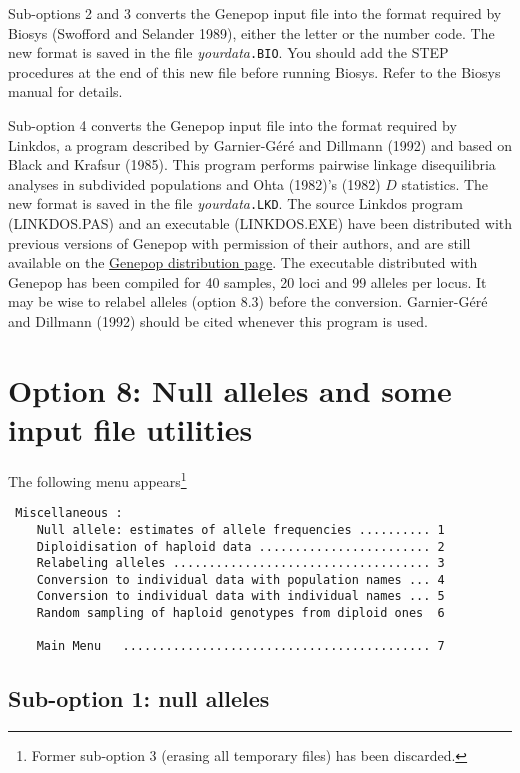 \documentclass[12pt,]{book}
\let\rmarkdownfootnote\footnote%
\def\footnote{\protect\rmarkdownfootnote}
\begin{document}
Sub-options 2 and 3 converts the Genepop input file into the format
required by Biosys (Swofford and Selander 1989),
either the letter or the number code. The new format is saved in the
file \emph{yourdata}\texttt{.BIO}. You should add the STEP procedures at
the end of this new file before running Biosys. Refer to the Biosys
manual for details.

Sub-option 4 converts the Genepop input file into the format required by
Linkdos, a program described by Garnier-Géré and
Dillmann (1992) and based on Black and Krafsur (1985). This program
performs pairwise linkage disequilibria analyses in subdivided
populations and Ohta (1982)'s (1982) \(D\)
statistics. The new
format is saved in the file \emph{yourdata}\texttt{.LKD}. The source
Linkdos program (LINKDOS.PAS) and an executable (LINKDOS.EXE) have been
distributed with previous versions of Genepop with permission of their
authors, and are still available on the
\href{http://kimura.univ-montp2.fr/~rousset/Genepop.htm}{Genepop
distribution page}. The executable distributed with Genepop has been
compiled for 40 samples, 20 loci and 99 alleles per locus. It may be
wise to relabel alleles (option 8.3) before the conversion. Garnier-Géré
and Dillmann (1992) should be cited whenever this program is used.

\section{Option 8: Null alleles and some input file
utilities}\label{option-8-null-alleles-and-some-input-file-utilities}

The following menu appears\footnote{Former sub-option 3 (erasing all
  temporary files) has been discarded.}

\begin{verbatim}
 Miscellaneous :
    Null allele: estimates of allele frequencies .......... 1
    Diploidisation of haploid data ........................ 2
    Relabeling alleles .................................... 3
    Conversion to individual data with population names ... 4
    Conversion to individual data with individual names ... 5
    Random sampling of haploid genotypes from diploid ones  6

    Main Menu   ........................................... 7
\end{verbatim}

\subsection{Sub-option 1: null alleles}\label{sub-option-1-null-alleles}
\end{document}
